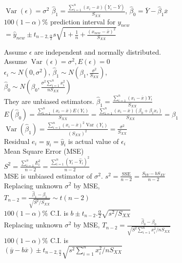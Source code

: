 \documentclass{article}
\DeclareMathOperator{\Var}{Var}
\begin{document}
\begin{figure}[h!]
\begin{subfigure}[h!]{0.5\textwidth}
        $\Var(\epsilon)=\sigma^{2}$ \quad $\hat{\beta}_{1}=\frac{\sum_{i=1}^{n}(x_{i}-\overline{x})(Y_{i}-\overline{Y})}{S_{XX}}$, $\hat{\beta}_{0}=\overline{Y}-\hat{\beta}_{1}\overline{x}$\\
        $100(1-\alpha)\%$ prediction interval for $y_{new}$\\
        $=\hat{y}_{new}\pm t_{n-2,\frac{\alpha}{2}}s\sqrt{1+\frac{1}{n}+\frac{(x_{new}-\overline{x})^{2}}{S_{XX}}}$
    \end{subfigure}
    \begin{subfigure}[h!]{0.49\textwidth}
        Assume $\epsilon$ are independent and normally distributed.\\
        Assume $\Var(\epsilon)=\sigma^{2},E(\epsilon)=0$\\
        $\epsilon_{i}\sim N(0,\sigma^{2})$, $\hat{\beta}_{1}\sim N\left(\beta_{1},\frac{\sigma^{2}}{S_{XX}}\right)$, $\hat{\beta}_{0}\sim N\left(\beta_{0},\frac{\sigma^{2}\sum_{i=1}^{n}x_{i}^{2}}{nS_{XX}}\right)$\\
        They are unbiased estimators. $\hat{\beta}_{1}=\frac{\sum_{i=1}^{n}(x_{i}-\overline{x})Y_{i}}{S_{XX}}$\\
        $E(\hat{\beta}_{0})=\frac{\sum_{i=1}^{n}(x_{i}-\overline{x})E(Y_{i})}{S_{XX}}=\frac{\sum_{i=1}^{n}(x_{i}-\overline{x})(\beta_{0}+\beta_{1}x_{i})}{S_{XX}}=\beta_{1}$\\
        $\Var(\hat{\beta}_{1})=\frac{\sum_{i=1}^{n}(x_{i}-\overline{x})^{2}\Var(Y_{i})}{(S_{XX})^{2}}=\frac{\sigma^{2}}{S_{XX}}$\\
        Residual $e_{i}=y_{i}=\hat{y}_{i}$ is actual value of $\epsilon_{i}$\\
        Mean Square Error (MSE) $S^{2}=\frac{\sum_{i=1}^{n}E_{i}^{2}}{n-2}=\frac{\sum_{i=1}^{n}(Y_{i}-\hat{Y}_{i})^{2}}{n-2}$\\
        MSE is unbiased estimator of $\sigma^{2}$. $s^{2}=\frac{\text{SSE}}{n-2}=\frac{S_{YY}-bS_{XY}}{n-2}$\\
        Replacing unknown $\sigma^{2}$ by MSE, $T_{n-2}=\frac{\hat{\beta}_{1}-\beta_{1}}{\sqrt{S^{2}/S_{XX}}}\sim t(n-2)$\\
        $100(1-\alpha)\%$ C.I. is $b\pm t_{n-2}.\frac{\alpha}{2}\sqrt{s^{2}/S_{XX}}$\\
        Replacing unknown $\sigma^{2}$ by MSE, $T_{n-2}=\frac{\hat{\beta}_{0}-\beta_{0}}{\sqrt{S^{2}\sum_{i=1}^{n}x_{i}^{2}/nS_{XX}}}$\\
        $100(1-\alpha)\%$ C.I. is $(\overline{y}-b\overline{x})\pm t_{n-2,\frac{\alpha}{2}}\sqrt{s^{2}\sum_{i=1}^{n}x_{i}^{2}/nS_{XX}}$\\

\end{subfigure}
\end{figure}
\end{document}
